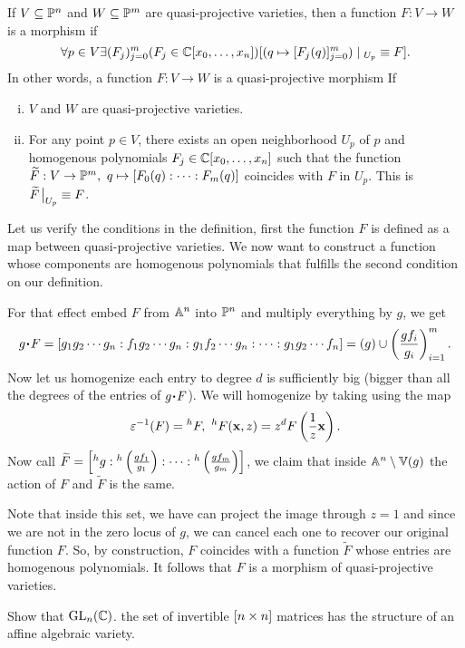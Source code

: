 \documentclass[12pt]{memoir}
\begin{document}
  \begin{Def}
    If $V\subseteq\mathbb{P}^n$ and $W\subseteq\mathbb{P}^m$ are quasi-projective varieties, then a function $F:V\to W$ is a morphism if 
    $$\forall p\in V\exists (F_j)_{j=0}^m (F_j\in\bC[x_0,\dots,x_n])[(q\mapsto [F_j(q)]_{j=0}^m)\mid_{U_p}\equiv F].$$
    In other words, a function $F:V\to W$ is a quasi-projective morphism If
    \begin{enumerate}[i)]
      \itemsep=-0.4em
      \item $V$ and $W$ are quasi-projective varieties.
      \item For any point $p\in V$, there exists an open neighborhood $U_p$ of $p$ and homogenous polynomials $F_j\in\mathbb{C}[x_0,\dots,x_n]$ such that the function $\widetilde{F}:V\to\bP^m,\ q\mapsto[F_0(q):\dots:F_m(q)]$ coincides with $F$ in $U_p$. This is $\widetilde{F}\eval_{U_p}\equiv F$.
    \end{enumerate}
  \end{Def}

  \begin{ptcbr}
    Let us verify the conditions in the definition, first the function $F$ is defined as a map between quasi-projective varieties. We now want to construct a function whose components are homogenous polynomials that fulfills the second condition on our definition.\par 
    For that effect embed $F$ from $\mathbb{A}^n$ into $\mathbb{P}^n$ and multiply everything by $g$, we get 
    $$g\.F=[g_1g_2\cdots g_n:f_1g_2\cdots g_n:g_1f_2\cdots g_n:\dots:g_1g_2\cdots f_n]=(g)\cup\left(\frac{gf_i}{g_i}\right)_{i=1}^m.$$
    Now let us homogenize each entry to degree $d$ is sufficiently big (bigger than all the degrees of the entries of $g\.F$). We will homogenize by taking using the map 
    $$\eps^{-1}(F)={}^hF,\ {}^hF(\vec{x},z)= z^dF\left(\frac{1}{z}\vec{x}\right).$$
    Now call $\widetilde{F}=\left\lbrack{}^hg:{}^h\left(\frac{gf_1}{g_1}\right):\dots:{}^h\left(\frac{gf_m}{g_m}\right)\right\rbrack$, we claim that inside $\mathbb{A}^n\setminus\mathbb{V}(g)$ the action of $F$ and $\widetilde{F}$ is the same.\par 
    Note that inside this set, we have can project the image through $z=1$ and since we are not in the zero locus of $g$, we can cancel each one to recover our original function $F$. So, by construction, $F$ coincides with a function $\widetilde{F}$ whose entries are homogenous polynomials. It follows that $F$ is a morphism of quasi-projective varieties.
  \end{ptcbr}

  \begin{Ej}
    Show that $\mathrm{GL}_n(\mathbb{C})$. the set of invertible $[n\times n]$ matrices has the structure of an affine algebraic variety.
  \end{Ej}
\end{document}
